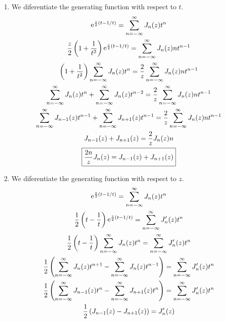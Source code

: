 {%
\begin{Solution}
  \begin{enumerate}
  \item
    We diferentiate the generating function with respect to $t$.
    \begin{gather*}
      \mathop{\mathrm{e}}\nolimits^{\frac{z}{2} (t - 1/t)} = \sum_{n = -\infty}^\infty J_n(z) t^n 
      \\
      \frac{z}{2} \left( 1 + \frac{1}{t^2} \right) \mathop{\mathrm{e}}\nolimits^{\frac{z}{2} (t - 1/t)} 
      = \sum_{n = -\infty}^\infty J_n(z) n t^{n-1} 
      \\
      \left( 1 + \frac{1}{t^2} \right) \sum_{n = -\infty}^\infty J_n(z) t^n
      = \frac{2}{z} \sum_{n = -\infty}^\infty J_n(z) n t^{n-1} 
      \\
      \sum_{n = -\infty}^\infty J_n(z) t^n + \sum_{n = -\infty}^\infty J_n(z) t^{n-2}
      = \frac{2}{z} \sum_{n = -\infty}^\infty J_n(z) n t^{n-1} 
      \\
      \sum_{n = -\infty}^\infty J_{n-1}(z) t^{n-1} + \sum_{n = -\infty}^\infty J_{n+1}(z) t^{n-1}
      = \frac{2}{z} \sum_{n = -\infty}^\infty J_n(z) n t^{n-1} 
      \\
      J_{n-1}(z) + J_{n+1}(z) = \frac{2}{z} J_n(z) n 
      \\
      \boxed{
        \frac{2 n}{z} J_n(z) = J_{n-1}(z) + J_{n+1}(z)
        }
    \end{gather*}
  \item
    We diferentiate the generating function with respect to $z$.
    \begin{gather*}
      \e^{\frac{z}{2} (t - 1/t)} = \sum_{n = -\infty}^\infty J_n(z) t^n 
      \\
      \frac{1}{2} \left( t - \frac{1}{t} \right) \e^{\frac{z}{2} (t - 1/t)} 
      = \sum_{n = -\infty}^\infty J_n'(z) t^n 
      \\
      \frac{1}{2} \left( t - \frac{1}{t} \right) \sum_{n = -\infty}^\infty J_n(z) t^n
      = \sum_{n = -\infty}^\infty J_n'(z) t^n 
      \\
      \frac{1}{2} \left( \sum_{n = -\infty}^\infty J_n(z) t^{n+1} 
        - \sum_{n = -\infty}^\infty J_n(z) t^{n-1} \right) = \sum_{n = -\infty}^\infty J_n'(z) t^n 
      \\
      \frac{1}{2} \left( \sum_{n = -\infty}^\infty J_{n-1}(z) t^n 
        - \sum_{n = -\infty}^\infty J_{n+1}(z) t^n \right) = \sum_{n = -\infty}^\infty J_n'(z) t^n 
      \\
      \frac{1}{2} \left( J_{n-1}(z) - J_{n+1}(z) \right) = J_n'(z) 

\end{gather*}
\end{enumerate}
\end{Solution}}
